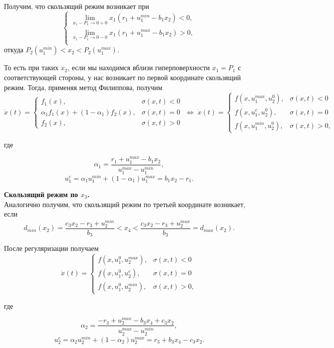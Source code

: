 \documentclass[11pt]{article}
\begin{document}
Получим, что скользящий режим возникает при 
$$
\left\{
\begin{aligned}
	\lim_{x_1 - P_1 \to 0 + 0} x_1(r_1 + u_1^{min} - b_1x_2) < 0, \\
	\lim_{x_1 - P_1 \to 0 - 0} x_1(r_1 + u_1^{max} - b_1x_2) > 0, \\
\end{aligned}
\right.
$$
откуда $P_2(u_1^{min}) < x_2 < P_2(u_1^{max}).$

То есть при таких $x_2$, если мы находимся вблизи гиперповерхности $x_1 = P_1$ с соответствующей стороны, у нас возникает по первой координате скользящий режим. Тогда, применяя метод Филиппова, получим 
$$
\dot x(t) = \begin{cases} f_1(x), & \sigma(x,t) < 0 \\ \alpha_1 f_1(x) + (1 - \alpha_1) f_2(x), & \sigma(x,t) = 0 \\ f_2(x), & \sigma(x,t) > 0\end{cases} \; \Leftrightarrow \; \dot x(t) = \begin{cases} f(x,u_1^{max}, u_2^0), & \sigma(x,t) < 0 \\ f(x, u_1^c, u_2^0), & \sigma(x,t) = 0 \\ f(x, u_1^{min}, u_2^0), & \sigma(x,t) > 0,\end{cases}
$$

где

$$\alpha_1 = \frac{r_1 + u_1^{max} - b_1x_2}{u_1^{max} - u_1^{min}},$$
$$u_1^c = \alpha_1 u_1^{min} + (1-\alpha_1)u_1^{max} = b_1x_2 - r_1.$$

{\bf Скользящий режим по $x_3$.}\\

Аналогично получим, что скользящий режим по третьей координате возникает, если $$d_{min}(x_2) = \frac{c_3x_2 - r_3 + u_2^{min}}{b_3} < x_4 < \frac{c_3x_2 - r_3 + u_2^{max}}{b_3} = d_{max}(x_2).$$

После регуляризации получаем
$$
\dot x(t) = \begin{cases} f(x,u_1^0, u_2^{max}), & \sigma(x,t) < 0 \\ f(x, u_1^0, u_2^c), & \sigma(x,t) = 0 \\ f(x, u_1^0, u_2^{min}), & \sigma(x,t) > 0,\end{cases}
$$

где

$$\alpha_2 = \frac{-r_3 + u_2^{max} - b_3x_4 + c_3x_2}{u_2^{max} - u_2^{min}},$$
$$u_2^c = \alpha_2 u_2^{min} + (1-\alpha_2)u_2^{max} = r_3 + b_3x_4 - c_3x_2.$$
\end{document}
